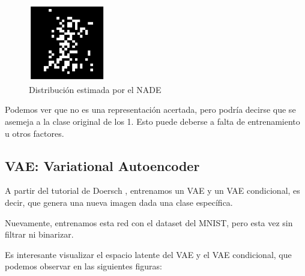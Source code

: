\documentclass[11pt]{article}
\begin{document}
\begin{figure}[h]
    \centering
    \includegraphics[width=0.3\textwidth]{NADE/nade_generation.png}
    \caption{Distribución estimada por el NADE}
    \label{fig:nade_gen}
\end{figure}

Podemos ver que no es una representación acertada, pero podría decirse que se asemeja a la clase original de los 1. Esto puede deberse a falta de entrenamiento u otros factores.
\newpage
\subsection{VAE: Variational Autoencoder}

A partir del tutorial de Doersch \cite{vae}, entrenamos un VAE y un VAE condicional, es decir, que genera una nueva imagen dada una clase específica.

Nuevamente, entrenamos esta red con el dataset del MNIST, pero esta vez sin filtrar ni binarizar.

Es interesante visualizar el espacio latente del VAE y el VAE condicional, que podemos observar en las siguientes figuras:
\end{document}
